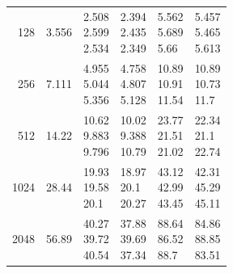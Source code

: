 \begin{longtable}{rrp{2.85cm}p{2.85cm}p{2.85cm}p{2.85cm}}
128 & 3.556 & \shortstack[r]{2.508\\2.599\\2.534} & \shortstack[r]{2.394\\2.435\\2.349} & \shortstack[r]{5.562\\5.689\\5.66} & \shortstack[r]{5.457\\5.465\\5.613} \\
256 & 7.111 & \shortstack[r]{4.955\\5.044\\5.356} & \shortstack[r]{4.758\\4.807\\5.128} & \shortstack[r]{10.89\\10.91\\11.54} & \shortstack[r]{10.89\\10.73\\11.7} \\
512 & 14.22 & \shortstack[r]{10.62\\9.883\\9.796} & \shortstack[r]{10.02\\9.388\\10.79} & \shortstack[r]{23.77\\21.51\\21.02} & \shortstack[r]{22.34\\21.1\\22.74} \\
1024 & 28.44 & \shortstack[r]{19.93\\19.58\\20.1} & \shortstack[r]{18.97\\20.1\\20.27} & \shortstack[r]{43.12\\42.99\\43.45} & \shortstack[r]{42.31\\45.29\\45.11} \\
2048 & 56.89 & \shortstack[r]{40.27\\39.72\\40.54} & \shortstack[r]{37.88\\39.69\\37.34} & \shortstack[r]{88.64\\86.52\\88.7} & \shortstack[r]{84.86\\88.85\\83.51} \\

\end{longtable}
